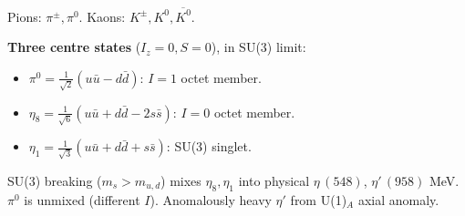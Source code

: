 \documentclass[11pt]{article}
\newcommand{\Kbar}{\overline{K^{0}}}
\begin{document}
Pions: $\pi^\pm,\pi^0$. Kaons: $K^\pm, K^0,\Kbar$.

\textbf{Three centre states} ($I_z=0,S=0$), in SU(3) limit:
\begin{itemize}
\item $\pi^0 = \tfrac{1}{\sqrt 2}(u\bar u - d\bar d)$: $I=1$ octet member.
\item $\eta_8 = \tfrac{1}{\sqrt 6}(u\bar u + d\bar d - 2 s\bar s)$: $I=0$ octet member.
\item $\eta_1 = \tfrac{1}{\sqrt 3}(u\bar u + d\bar d + s\bar s)$: SU(3) singlet.
\end{itemize}
SU(3) breaking ($m_s > m_{u,d}$) mixes $\eta_8, \eta_1$ into physical $\eta\,(548)$, $\eta'\,(958)$ MeV. $\pi^0$ is unmixed (different $I$). Anomalously heavy $\eta'$ from U(1)$_A$ axial anomaly.
\end{document}
